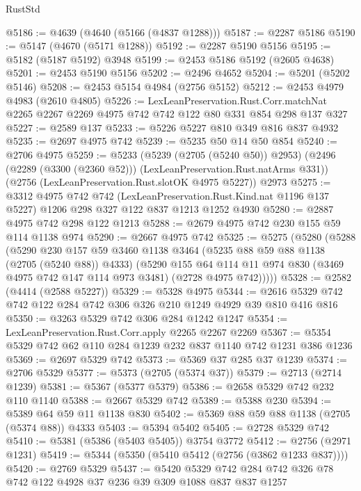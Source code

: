 \begin{lexlean}{RustStd}
\begin{coremodule}
@5186 := @4639 (@4640 (@5166 (@4837 @1288)))
@5187 := @2287 @5186
@5190 := @5147 (@4670 (@5171 @1288))
@5192 := @2287 @5190 @5156
@5195 := @5182 (@5187 @5192) @3948
@5199 := @2453 @5186 @5192 (@2605 @4638)
@5201 := @2453 @5190 @5156
@5202 := @2496 @4652
@5204 := @5201 (@5202 @5146)
@5208 := @2453 @5154 @4984 (@2756 @5152)
@5212 := @2453 @4979 @4983 (@2610 @4805)
@5226 := LexLeanPreservation.Rust.Corr.matchNat
    @2265
    @2267
    @2269
    @4975
    @742
    @742
    @122
    @80
    @331
    @854
    @298
    @137
    @327
@5227 := @2589 @137
@5233 := @5226 @5227 @810 @349 @816 @837 @4932
@5235 := @2697 @4975 @742
@5239 := @5235 @50 @14 @50 @854
@5240 := @2706 @4975
@5259 := @5233
    (@5239 (@2705 (@5240 @50)) @2953)
    (@2496 (@2289 (@3300 (@2360 @52))) (LexLeanPreservation.Rust.natArms @331))
    (@2756 (LexLeanPreservation.Rust.slotOK @4975 @5227))
    @2973
@5275 := @3312
    @4975
    @742
    @742
    (LexLeanPreservation.Rust.Kind.nat @1196 @137 @5227)
    @1206
    @298
    @327
    @122
    @837
    @1213
    @1252
    @4930
@5280 := @2887 @4975 @742 @298 @122 @1213
@5288 := @2679 @4975 @742 @230 @155 @59 @114 @1138 @974
@5290 := @2667 @4975 @742
@5325 := @5275
    (@5280
      (@5288
        (@5290
          @230
          @157
          @59
          @3460
          @1138
          @3464
          (@5235 @88 @59 @88 @1138 (@2705 (@5240 @88)) @4333)
          (@5290
            @155
            @64
            @114
            @11
            @974
            @830
            (@3469 @4975 @742 @147 @114 @973 @3481)
            (@2728 @4975 @742)))))
@5328 := @2582 (@4414 (@2588 @5227))
@5329 := @5328 @4975
@5344 := @2616 @5329 @742 @742 @122 @284 @742 @306 @326 @210 @1249 @4929 @39 @810 @416 @816
@5350 := @3263 @5329 @742 @306 @284 @1242 @1247
@5354 := LexLeanPreservation.Rust.Corr.apply @2265 @2267 @2269
@5367 := @5354 @5329 @742 @62 @110 @284 @1239 @232 @837 @1140 @742 @1231 @386 @1236
@5369 := @2697 @5329 @742
@5373 := @5369 @37 @285 @37 @1239
@5374 := @2706 @5329
@5377 := @5373 (@2705 (@5374 @37))
@5379 := @2713 (@2714 @1239)
@5381 := @5367 (@5377 @5379)
@5386 := @2658 @5329 @742 @232 @110 @1140
@5388 := @2667 @5329 @742
@5389 := @5388 @230
@5394 := @5389 @64 @59 @11 @1138 @830
@5402 := @5369 @88 @59 @88 @1138 (@2705 (@5374 @88)) @4333
@5403 := @5394 @5402
@5405 := @2728 @5329 @742
@5410 := @5381 (@5386 (@5403 @5405)) @3754 @3772
@5412 := @2756 (@2971 @1231)
@5419 := @5344 (@5350 (@5410 @5412 (@2756 (@3862 @1233 @837))))
@5420 := @2769 @5329
@5437 := @5420 @5329 @742 @284 @742 @326 @78 @742 @122 @4928 @37 @236 @39 @309 @1088 @837 @837 @1257

\end{coremodule}
\end{lexlean}
